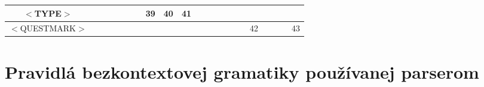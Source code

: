 \documentclass[a4paper,11pt]{article}
\begin{document}
\begin{table}[htbp]
\begin{tabular}{|c|c|c|c|c|c|c|c|c|c|c|c|c|c|c|c|c|c|c|c|c|}
\hline
$<$TYPE$>$          &                             &                        &                        &                         &                           &                             & \multicolumn{1}{c|}{39}      & \multicolumn{1}{c|}{40}     & \multicolumn{1}{c|}{41}     &                          &                           &                         &                          &                          &                            &                         &                             &                         &                           & \multicolumn{1}{l|}{}  \\ 
\hline
$<$QUESTMARK$>$     &                             &                        &                        &                         &                           &                             &                              &                             &                             &                          &                           &                         &                          &                          &                            & \multicolumn{1}{c|}{42} &                             &                         &                           & 43                     \\
\hline
\end{tabular}
\end{table}

\newpage

\section{Pravidlá bezkontextovej gramatiky používanej parserom}
\end{document}
